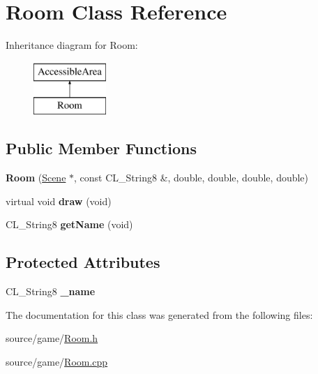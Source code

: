 \hypertarget{classRoom}{
\section{Room Class Reference}
\label{classRoom}
}
Inheritance diagram for Room:\begin{figure}[H]
\begin{center}
\leavevmode
\includegraphics[height=2cm]{classRoom}
\end{center}
\end{figure}
\subsection*{Public Member Functions}
\begin{DoxyCompactItemize}
\item 
\hypertarget{classRoom_a063d845a90d110a4ef1672cd47d3bd70}{
{\bfseries Room} (\hyperlink{classScene}{Scene} $\ast$, const CL\_\-String8 \&, double, double, double, double)}
\label{classRoom_a063d845a90d110a4ef1672cd47d3bd70}

\item 
\hypertarget{classRoom_ac0b17aaf2c3e3c2e0aff771a7a2b7741}{
virtual void {\bfseries draw} (void)}
\label{classRoom_ac0b17aaf2c3e3c2e0aff771a7a2b7741}

\item 
\hypertarget{classRoom_aef0381c8b9ce884f3dcca64882ac06bb}{
CL\_\-String8 {\bfseries getName} (void)}
\label{classRoom_aef0381c8b9ce884f3dcca64882ac06bb}

\end{DoxyCompactItemize}
\subsection*{Protected Attributes}
\begin{DoxyCompactItemize}
\item 
\hypertarget{classRoom_ac583346cccae43f9fef8d484e2e084e6}{
CL\_\-String8 {\bfseries \_\-name}}
\label{classRoom_ac583346cccae43f9fef8d484e2e084e6}

\end{DoxyCompactItemize}


The documentation for this class was generated from the following files:\begin{DoxyCompactItemize}
\item 
source/game/\hyperlink{Room_8h}{Room.h}\item 
source/game/\hyperlink{Room_8cpp}{Room.cpp}\end{DoxyCompactItemize}
